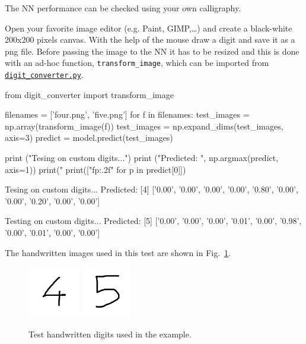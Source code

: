 The NN performance can be checked using your own calligraphy. 

Open your favorite image editor (e.g. Paint, GIMP,\ldots) and create a black-white 200x200 pixels canvas. With the help of the mouse draw a digit and save it as a png file.
Before passing the image to the NN it has to be resized and this is done with an ad-hoc function, \texttt{transform\_image}, which can be imported from \href{https://raw.githubusercontent.com/matteosan1/finance_course/develop/libro/input_files/digit_converter.py}{\texttt{digit\_converter.py}}.

\begin{ipython}
from digit_converter import transform_image

filenames = ['four.png', 'five.png']
for f in filenames:
    test_images = np.array(transform_image(f))
test_images = np.expand_dims(test_images, axis=3)
predict = model.predict(test_images)

print ("Tesing on custom digits...")
print ("Predicted: ", np.argmax(predict, axis=1))
print("%
print(["f{p:.2f}" for p in predict[0]])
\end{ipython}
\begin{ioutput}
Tesing on custom digits...
Predicted:  [4]
['0.00', '0.00', '0.00', '0.00', '0.80', '0.00', '0.00', '0.20', '0.00', 
'0.00']

Testing on custom digits...
Predicted:  [5]
['0.00', '0.00', '0.00', '0.01', '0.00', '0.98', '0.00', '0.01', '0.00', 
'0.00']
\end{ioutput}
The handwritten images used in this test are shown in Fig.~\ref{fig:test_images}.

\begin{figure}[htb]
\centering
\includegraphics[width=0.2\textwidth]{figures/four.png}
\includegraphics[width=0.2\textwidth]{figures/five.png}
\caption{Test handwritten digits used in the example.}
\label{fig:test_images}
\end{figure}

